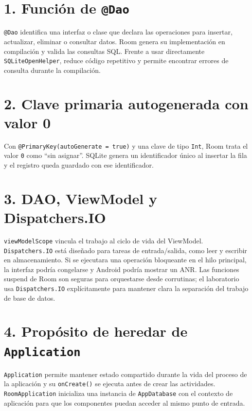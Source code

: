 \documentclass[12pt,a4paper,oneside]{report}
\begin{document}
\section*{1. Función de \texttt{@Dao}}
\texttt{@Dao} identifica una interfaz o clase que declara las operaciones para
insertar, actualizar, eliminar o consultar datos. Room genera su implementación en
compilación y valida las consultas SQL. Frente a usar directamente
\texttt{SQLiteOpenHelper}, reduce código repetitivo y permite encontrar errores de
consulta durante la compilación.

\section*{2. Clave primaria autogenerada con valor 0}
Con \texttt{@PrimaryKey(autoGenerate = true)} y una clave de tipo \texttt{Int},
Room trata el valor \texttt{0} como “sin asignar”. SQLite genera un identificador
único al insertar la fila y el registro queda guardado con ese identificador.

\section*{3. DAO, ViewModel y Dispatchers.IO}
\texttt{viewModelScope} vincula el trabajo al ciclo de vida del ViewModel.
\texttt{Dispatchers.IO} está diseñado para tareas de entrada/salida, como leer y
escribir en almacenamiento. Si se ejecutara una operación bloqueante en el hilo
principal, la interfaz podría congelarse y Android podría mostrar un ANR. Las
funciones suspend de Room son seguras para orquestarse desde corrutinas; el
laboratorio usa \texttt{Dispatchers.IO} explícitamente para mantener clara la
separación del trabajo de base de datos.

\section*{4. Propósito de heredar de \texttt{Application}}
\texttt{Application} permite mantener estado compartido durante la vida del proceso
de la aplicación y su \texttt{onCreate()} se ejecuta antes de crear las actividades.
\texttt{RoomApplication} inicializa una instancia de \texttt{AppDatabase} con el
contexto de aplicación para que los componentes puedan acceder al mismo punto de
entrada.
\end{document}
